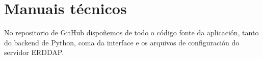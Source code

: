 \chapter{Manuais técnicos}\label{manuais}

No repositorio de GitHub \url{} dispoñemos de todo o código fonte da aplicación, tanto do backend de Python, coma da interface e os arquivos de configuración do servidor ERDDAP.